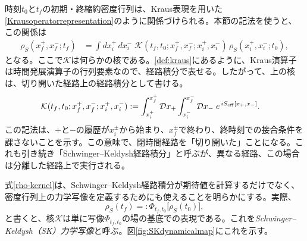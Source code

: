 \documentclass[a4paper,11pt,oneside]{article}
\theoremstyle{definition}
\numberwithin{equation}{section}
\begin{document}
時刻\(t_0\)と\(t_{f}\)の初期・終縮約密度行列は、Kraus表現を用いた\eqref{Krausoperatorrepresentation}のように関係づけられる。本節の記法を使うと、この関係は
\begin{align}\label{rho-kernel}
\rho_S(x_f^+,x_f^-;t_f)
&=
\int dx_i^+\,dx_i^- \;
\mathcal K(t_f,t_0;x_f^+,x_f^-;x_i^+,x_i^-)\,
\rho_S(x_i^+,x_i^-;t_0) ,
\end{align}
となる。ここで\(\mathcal K\)は何らかの核である。\eqref{def:kraus}にあるように、Kraus演算子は時間発展演算子の行列要素なので、経路積分で表せる。したがって、上の核は、切り開いた経路上の経路積分として書ける。
\begin{align}\label{Kkernel}
\mathcal K(t_f,t_0;x_f^+,x_f^-;x_i^+,x_i^-)
&:=
\int_{x_i^+}^{x_f^+}\mathcal D x_+
\int_{x_i^-}^{x_f^-}\mathcal D x_-\;
e^{\,iS_{\rm eff}[x_+,x_-]} .
\end{align}
この記法は、\(+\)と\(-\)の履歴が\(x_i^\pm\)から始まり、\(x_f^\pm\)で終わり、終時刻での接合条件を課さないことを示す。この意味で、閉時間経路を「切り開いた」ことになる。これも引き続き「Schwinger--Keldysh経路積分」と呼ぶが、異なる経路、この場合は分離した経路上で実行される。



式\eqref{rho-kernel}は、Schwinger--Keldysh経路積分が期待値を計算するだけでなく、密度行列上の力学写像を定義するためにも使えることを明らかにする。実際、
\begin{equation}
\rho_S(t_f)=:\Phi_{t_f,t_0}\bigl[\rho_S(t_0)\bigr] ,
\end{equation}
と書くと、核\(\mathcal K\)は単に写像\(\Phi_{t_f,t_0}\)の場の基底での表現である。これを\textit{Schwinger--Keldysh（SK）力学写像}と呼ぶ。図\ref{fig:SKdynamicalmap}にこれを示す。
\end{document}

